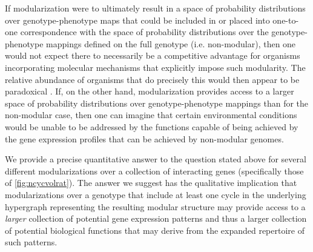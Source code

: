 If modularization were to ultimately result in a space of probability distributions over genotype-phenotype maps that could be included in or placed into one-to-one correspondence with the space of probability distributions over the genotype-phenotype mappings defined on the full genotype (i.e. non-modular), then one would not expect there to necessarily be a competitive advantage for organisms incorporating molecular mechanisms that explicitly impose such modularity. The relative abundance of organisms that do precisely this would then appear to be paradoxical \cite{Jothi2009,Colm}. If, on the other hand, modularization provides access to a larger space of probability distributions over genotype-phenotype mappings than for the non-modular case, then one can imagine that certain environmental conditions would be unable to be addressed by the functions capable of being achieved by the gene expression profiles that can be achieved by non-modular genomes.

We provide a precise quantitative answer to the question stated above for several different modularizations over a collection of interacting genes (specifically those of \ref{fig:ncycvolrat}). The answer we suggest has the qualitative implication that modularizations over a genotype that include at least one cycle in the underlying hypergraph representing the resulting modular structure may provide access to a \emph{larger} collection of potential gene expression patterns and thus a larger collection of potential biological functions that may derive from the expanded repertoire of such patterns.
